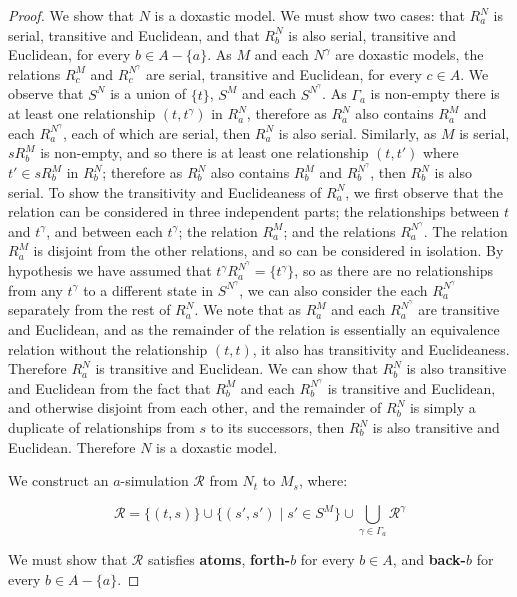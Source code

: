 \begin{proof}
We show that $N$ is a doxastic model. We must show two cases: that $R^N_a$
is serial, transitive and Euclidean, and that $R^N_b$ is also serial, transitive
and Euclidean, for every $b \in A - \{a\}$. As $M$ and each $N^\gamma$ are doxastic
models, the relations $R^M_c$ and $R^{N^\gamma}_c$ are serial, transitive and
Euclidean, for every $c \in A$. We observe that $S^N$ is a union of $\{t\}$,
$S^M$ and each $S^{N^\gamma}$. As $\Gamma_a$ is non-empty there is at
least one relationship $(t, t^\gamma)$ in $R^N_a$, therefore as $R^N_a$ also
contains $R^M_a$ and each $R^{N^\gamma}_a$, each of which are serial, then $R^N_a$
is also serial. Similarly, as $M$ is serial, $sR^M_b$ is non-empty, and so there
is at least one relationship $(t, t')$ where $t' \in sR^M_b$ in $R^N_b$;
therefore as $R^N_b$ also contains $R^M_b$ and $R^{N^\gamma}_b$, then $R^N_b$ is
also serial. To show the transitivity and Euclideaness of $R^N_a$, we first
observe that the relation can be considered in three independent parts; the
relationships between $t$ and $t^\gamma$, and between each $t^\gamma$; the
relation $R^M_a$; and the relations $R^{N^\gamma}_a$. The relation $R^M_a$ is
disjoint from the other relations, and so can be considered in isolation. By
hypothesis we have assumed that $t^\gamma R^{N^\gamma}_a = \{t^\gamma\}$, so as
there are no relationships from any $t^\gamma$ to a different state in
$S^{N^\gamma}$, we can also consider the each $R^{N^\gamma}_a$ separately from
the rest of $R^N_a$. We note that as $R^M_a$ and each $R^{N^\gamma}_a$ are
transitive and Euclidean, and as the remainder of the relation is essentially an
equivalence relation without the relationship $(t, t)$, it also has transitivity
and Euclideaness. Therefore $R^N_a$ is transitive and Euclidean. We can show
that $R^N_b$ is also transitive and Euclidean from the fact that $R^M_b$ and
each $R^{N^\gamma}_b$ is transitive and Euclidean, and otherwise disjoint from
each other, and the remainder of $R^N_b$ is simply a duplicate of relationships
from $s$ to its successors, then $R^N_b$ is also transitive and Euclidean.
Therefore $N$ is a doxastic model.

We construct an $a$-simulation $\mathcal{R}$ from $N_t$ to $M_s$, where:

$$\mathcal{R} = \{(t, s)\} \cup \{(s', s') \mid s' \in S^M \} 
\cup \bigcup_{\gamma \in \Gamma_a} \mathcal{R}^\gamma$$

We must show that $\mathcal{R}$ satisfies {\bf atoms}, {\bf forth-$b$} for every
$b \in A$, and {\bf back-$b$} for every $b \in A - \{a\}$.


\end{proof}
